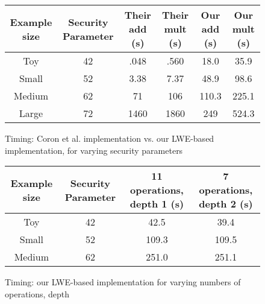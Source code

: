 \documentclass[letterpaper,twocolumn,10pt]{article}
\begin{document}
\begin{figure*}[htb!]
    \centering
    \begin{minipage}[b]{1\textwidth}
        \begin{center}
\begin{tabular}{|c|c|c|c|c|c|} \hline
Example size & Security Parameter & Their add (s) & Their mult (s) & Our add (s) & Our mult (s) \\ \hline
Toy & 42 & .048 & .560 & 18.0 & 35.9 \\ \hline
Small & 52 & 3.38 & 7.37 & 48.9 & 98.6 \\ \hline
Medium & 62 & 71 & 106 & 110.3 & 225.1 \\ \hline
Large & 72 & 1460 & 1860 & 249 & 524.3 \\ \hline
\end{tabular}
\end{center}
\caption{Timing: Coron et al. implementation vs. our LWE-based implementation, for varying security parameters}
    \end{minipage}
    \label{fig:coron}
    \end{figure*}
\begin{figure*}[htb!]

    \begin{minipage}[b]{1\textwidth}
        \begin{center}
\begin{tabular}{|c|c|c|c|} \hline
Example size & Security Parameter & 11 operations, depth 1 (s) & 7 operations, depth 2 (s) \\ \hline
Toy & 42 & 42.5 & 39.4 \\ \hline
Small & 52 & 109.3 & 109.5 \\ \hline
Medium & 62 & 251.0 & 251.1 \\ \hline
\end{tabular}
\end{center}
\caption{Timing: our LWE-based implementation for varying numbers of operations, depth}
\label{fig:depth}

    \end{minipage}
\end{figure*}
\end{document}
